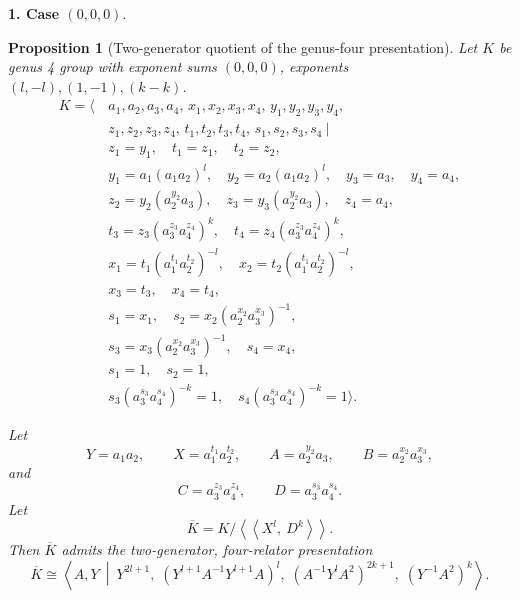 \documentclass{article}
\newtheorem{prop}[theorem]{Proposition}
\begin{document}
{\bf 1. Case $(0,0,0).$}
\begin{prop}[Two-generator quotient of the genus-four presentation] Let \(K\)  be genus 4 group with exponent sums $(0,0,0)$, exponents $(l,-l),(1,-1),(k-k)$.
\[
\begin{aligned}
K=\big\langle\,&
a_1,a_2,a_3,a_4,\,
x_1,x_2,x_3,x_4,\,
y_1,y_2,y_3,y_4,\\
& z_1,z_2,z_3,z_4,\,
t_1,t_2,t_3,t_4,\,
s_1,s_2,s_3,s_4
\ \big|\ \\[2mm]
& z_1=y_1,\quad
  t_1=z_1,\quad
  t_2=z_2,\\
& y_1=a_1(a_1a_2)^l,\quad
  y_2=a_2(a_1a_2)^l,\quad
  y_3=a_3,\quad
  y_4=a_4,\\
& z_2=y_2(a_2^{y_2}a_3),\quad
  z_3=y_3(a_2^{y_2}a_3),\quad
  z_4=a_4,\\
& t_3=z_3(a_3^{z_3}a_4^{z_4})^k,\quad
  t_4=z_4(a_3^{z_3}a_4^{z_4})^k,\\
& x_1=t_1(a_1^{t_1}a_2^{t_2})^{-l},\quad
  x_2=t_2(a_1^{t_1}a_2^{t_2})^{-l},\\
& x_3=t_3,\quad
  x_4=t_4,\\
& s_1=x_1,\quad
  s_2=x_2(a_2^{x_2}a_3^{x_3})^{-1},\\
& s_3=x_3(a_2^{x_2}a_3^{x_3})^{-1},\quad
  s_4=x_4,\\
& s_1=1,\quad
  s_2=1,\\
& s_3(a_3^{s_3}a_4^{s_4})^{-k}=1,\quad
  s_4(a_3^{s_3}a_4^{s_4})^{-k}=1
\big\rangle .
\end{aligned}
\]

Let
\[
Y=a_1a_2,\qquad
X=a_1^{t_1}a_2^{t_2},\qquad
A=a_2^{y_2}a_3,\qquad
B=a_2^{x_2}a_3^{x_3},
\]
and
\[
C=a_3^{z_3}a_4^{z_4},
\qquad
D=a_3^{s_3}a_4^{s_4}.
\]
 Let
\[
\overline{K}
=
K/\left\langle\!\left\langle X^l,\ D^k\right\rangle\!\right\rangle .
\]
Then \(\overline{K}\) admits the two-generator, four-relator presentation
\[
{
\overline{K}
\cong
\left\langle A,Y \ \middle|\ 
Y^{2l+1},\;
\left(Y^{l+1}A^{-1}Y^{l+1}A\right)^l,\;
\left(A^{-1}Y^lA^2\right)^{2k+1},\;
\left(Y^{-1}A^2\right)^k
\right\rangle .
}\]

\end{prop}
\end{document}
